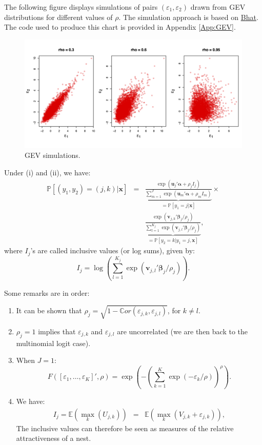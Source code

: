 \documentclass[
  12pt,
]{book}
\providecommand{\tightlist}{%
  \setlength{\itemsep}{0pt}\setlength{\parskip}{0pt}}
\theoremstyle{definition}
\theoremstyle{definition}
\theoremstyle{definition}
\theoremstyle{definition}
\theoremstyle{remark}
\begin{document}
The following figure displays simulations of pairs \((\varepsilon_1,\varepsilon_2)\) drawn from GEV distributions for different values of \(\rho\). The simulation approach is based on \href{http://www.caee.utexas.edu/prof/bhat/ABSTRACTS/Supp_material.pdf}{Bhat}. The code used to produce this chart is provided in Appendix \ref{App:GEV}.

\begin{figure}
\includegraphics[width=0.95\linewidth]{images/Figure_GEV} \caption{GEV simulations.}\label{fig:GEV}
\end{figure}

Under (i) and (ii), we have:
\begin{eqnarray}
\mathbb{P}[(y_1,y_2) = (j,k)|\mathbf{x}] &=& \underbrace{\frac{\exp(\mathbf{u}_j'\boldsymbol\alpha + \rho_j I_j)}{\sum_{m=1}^J \exp(\mathbf{u}_m'\boldsymbol\alpha + \rho_m I_m)}}_{= \mathbb{P}[y_1 = j|\mathbf{x}]} \times \nonumber\\
&& \underbrace{\frac{\exp(\mathbf{v}_{j,k}'\boldsymbol\beta_j/\rho_j)}{\sum_{l=1}^{K_j} \exp(\mathbf{v}_{j,l}'\boldsymbol\beta_j/\rho_j)}}_{= \mathbb{P}[y_2 = k|y_1=j,\mathbf{x}]}, \label{eq:Nested}
\end{eqnarray}
where \(I_j\)'s are called inclusive values (or log sums), given by:
\[
I_j = \log \left( \sum_{l=1}^{K_j} \exp(\mathbf{v}_{j,l}'\boldsymbol\beta_j/\rho_j)\right).
\]

Some remarks are in order:

\begin{enumerate}
\def\labelenumi{\alph{enumi}.}
\tightlist
\item
  It can be shown that \(\rho_j = \sqrt{1 - \mathbb{C}or(\varepsilon_{j,k},\varepsilon_{j,l})}\), for \(k \ne l\).
\item
  \(\rho_j=1\) implies that \(\varepsilon_{j,k}\) and \(\varepsilon_{j,l}\) are uncorrelated (we are then back to the multinomial logit case).
\item
  When \(J=1\):
  \[
  F([\varepsilon_1,\dots,\varepsilon_K]',\rho) = \exp\left(-\left(\sum_{k=1}^{K} \exp(-\varepsilon_k/\rho)\right)^{\rho}\right).
  \]
\item
  We have:
  \begin{eqnarray*}
  I_j = \mathbb{E}(\max_k(U_{j,k})) &=& \mathbb{E}(\max_k(V_{j,k} + \varepsilon_{j,k})),
  \end{eqnarray*}
  The inclusive values can therefore be seen as measures of the relative attractiveness of a nest.
\end{enumerate}
\end{document}

